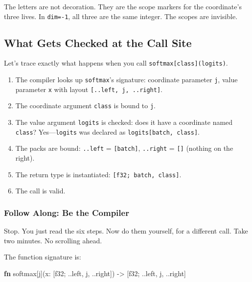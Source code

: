 \documentclass[11pt,titlepage]{article}
\newenvironment{Shaded}{}{}
\newcommand{\DataTypeTok}[1]{\textcolor[rgb]{0.56,0.13,0.00}{#1}}
\newcommand{\KeywordTok}[1]{\textcolor[rgb]{0.00,0.44,0.13}{\textbf{#1}}}
\newcommand{\NormalTok}[1]{#1}
\newcommand{\OperatorTok}[1]{\textcolor[rgb]{0.40,0.40,0.40}{#1}}
\providecommand{\tightlist}{%
  \setlength{\itemsep}{0pt}\setlength{\parskip}{0pt}}
\begin{document}
The letters are not decoration. They are the scope markers for the
coordinate's three lives. In \texttt{dim=-1}, all three are the same
integer. The scopes are invisible.

\vspace{2em}

\hypertarget{what-gets-checked-at-the-call-site}{%
\subsection{What Gets Checked at the Call
Site}\label{what-gets-checked-at-the-call-site}}

Let's trace exactly what happens when you call
\texttt{softmax{[}class{]}(logits)}.

\begin{enumerate}
\def\labelenumi{\arabic{enumi}.}
\tightlist
\item
  The compiler looks up \texttt{softmax}'s signature: coordinate
  parameter \texttt{j}, value parameter \texttt{x} with layout
  \texttt{{[}..left,\ j,\ ..right{]}}.
\item
  The coordinate argument \texttt{class} is bound to \texttt{j}.
\item
  The value argument \texttt{logits} is checked: does it have a
  coordinate named \texttt{class}? Yes---\texttt{logits} was declared as
  \texttt{logits{[}batch,\ class{]}}.
\item
  The packs are bound: \texttt{..left} = \texttt{{[}batch{]}},
  \texttt{..right} = \texttt{{[}{]}} (nothing on the right).
\item
  The return type is instantiated: \texttt{{[}f32;\ batch,\ class{]}}.
\item
  The call is valid.
\end{enumerate}

\vspace{2em}

\hypertarget{follow-along-be-the-compiler}{%
\subsubsection{Follow Along: Be the
Compiler}\label{follow-along-be-the-compiler}}

Stop. You just read the six steps. Now do them yourself, for a different
call. Take two minutes. No scrolling ahead.

The function signature is:

\begin{Shaded}
\begin{Highlighting}[]
\KeywordTok{fn}\NormalTok{ softmax[j](x: }\OperatorTok{[}\DataTypeTok{f32}\NormalTok{; ..left, j, ..right}\OperatorTok{]}\NormalTok{) -> }\OperatorTok{[}\DataTypeTok{f32}\NormalTok{; ..left, j, ..right}\OperatorTok{]}
\end{Highlighting}
\end{Shaded}
\end{document}
